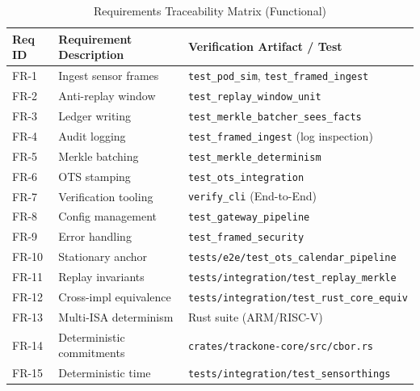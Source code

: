 \begin{table}[H]
\centering
\small
\caption{Requirements Traceability Matrix (Functional)}
\label{tab:req-traceability-fun}
\begin{tabularx}{\textwidth}{|l|>{\raggedright\arraybackslash}X|l|}
\hline
\textbf{Req ID} & \textbf{Requirement Description} & \textbf{Verification Artifact / Test} \\ \hline
FR-1  & Ingest sensor frames           & \texttt{test\_pod\_sim}, \texttt{test\_framed\_ingest} \\ \hline
FR-2  & Anti-replay window             & \texttt{test\_replay\_window\_unit} \\ \hline
FR-3  & Ledger writing                 & \texttt{test\_merkle\_batcher\_sees\_facts} \\ \hline
FR-4  & Audit logging                  & \texttt{test\_framed\_ingest} (log inspection) \\ \hline
FR-5  & Merkle batching                & \texttt{test\_merkle\_determinism} \\ \hline
FR-6  & \ac{OTS} stamping                   & \texttt{test\_ots\_integration} \\ \hline
FR-7  & Verification tooling           & \texttt{verify\_cli} (End-to-End) \\ \hline
FR-8  & Config management              & \texttt{test\_gateway\_pipeline} \\ \hline
FR-9  & Error handling                 & \texttt{test\_framed\_security} \\ \hline
FR-10 & Stationary anchor              & \texttt{tests/e2e/test\_ots\_calendar\_pipeline} \\ \hline
FR-11 & Replay invariants              & \texttt{tests/integration/test\_replay\_merkle} \\ \hline
FR-12 & Cross-impl equivalence         & \texttt{tests/integration/test\_rust\_core\_equiv} \\ \hline
FR-13 & Multi-\ac{ISA} determinism          & Rust suite (ARM/RISC-V) \\ \hline
FR-14 & Deterministic commitments       & \texttt{crates/trackone-core/src/cbor.rs} \\ \hline
FR-15 & Deterministic time             & \texttt{tests/integration/test\_sensorthings} \\ \hline
\end{tabularx}
\end{table}

